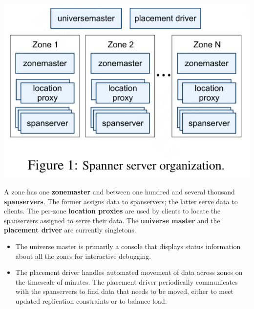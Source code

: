 \documentclass[11pt]{article}
\begin{document}
\begin{center}
\includegraphics[width=.5\textwidth]{../../images/papers/58.png}
\label{}
\end{center}

A zone has one \textbf{zonemaster} and between one hundred and several thousand \textbf{spanservers}. The former assigns
data to spanservers; the latter serve data to clients. The per-zone \textbf{location proxies} are used by
clients to locate the spanservers assigned to serve their data. The \textbf{universe master} and the \textbf{placement
driver} are currently singletons.
\begin{itemize}
\item The universe master is primarily a console that displays status information about all the zones for
interactive debugging.
\item The placement driver handles automated movement of data across zones on the timescale of minutes.
The placement driver periodically communicates with the spanservers to find data that needs to be
moved, either to meet updated replication constraints or to balance load.
\end{itemize}
\end{document}
